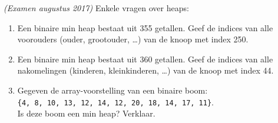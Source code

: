 \begin{oef}
\label{oef:getallen}
\papier \emph{(Examen augustus 2017)} Enkele vragen over heaps:
\begin{enumerate}
\item Een binaire min heap bestaat uit 355 getallen. Geef de indices van alle voorouders (ouder, grootouder, …) van de knoop met index 250. 

\item Een binaire min heap bestaat uit 360 getallen. Geef de indices van alle nakomelingen (kinderen, kleinkinderen, …) van de knoop met index 44. 

\item Gegeven de array-voorstelling van een binaire boom: \\ \verb+{4, 8, 10, 13, 12, 14, 12, 20, 18, 14, 17, 11}+.\\ Is deze boom een min heap? Verklaar.


\end{enumerate}
\end{oef}
